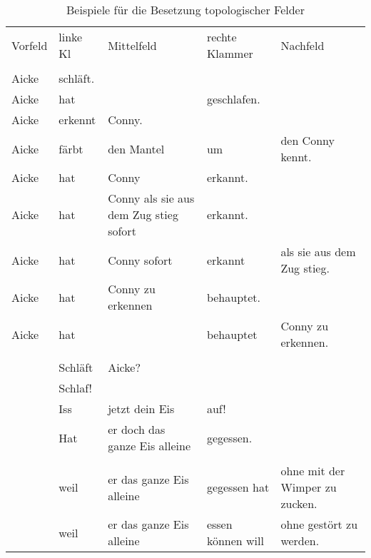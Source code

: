 \begin{table}[htbp]
\begin{sideways}
\begin{tabular}{lllll}
Vorfeld & linke Kl & Mittelfeld                             & rechte Klammer & Nachfeld                   \\ \\
Aicke    & schläft.                                                                                            \\
Aicke    & hat           &                                        & geschlafen.                                 \\
Aicke    & erkennt       & Conny.                                                                               \\
Aicke    & färbt         & den Mantel                             & um             & den Conny kennt.           \\
Aicke    & hat           & Conny                                  & erkannt.                                    \\
Aicke    & hat           & Conny als sie aus dem Zug stieg sofort & erkannt.                                    \\
Aicke    & hat           & Conny sofort                           & erkannt        & als sie aus dem Zug stieg. \\
Aicke    & hat           & Conny zu erkennen                      & behauptet.                                  \\
Aicke    & hat           &                                        & behauptet      & Conny zu erkennen.         \\ \\
        & Schläft       & Aicke?                                                                                \\
        & Schlaf!                                                                                              \\
        & Iss            & jetzt dein Eis                         & auf!                                        \\
        & Hat           & er doch das ganze Eis alleine          & gegessen.                                   \\  \\
        & weil          & er das ganze Eis alleine               & gegessen hat   & ohne mit der Wimper zu zucken.    \\
        & weil          & er das ganze Eis alleine               & essen können will   & ohne gestört zu werden.    \\
\end{tabular}
\end{sideways}
\caption{\label{bsp-topo}Beispiele für die Besetzung topologischer Felder}
\end{table}

